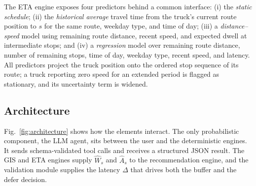 The ETA engine exposes four predictors behind a common interface: (i) the \emph{static schedule}; (ii) the \emph{historical average} travel time from the truck's current route position to $s$ for the same route, weekday type, and time of day; (iii) a \emph{distance--speed} model using remaining route distance, recent speed, and expected dwell at intermediate stops; and (iv) a \emph{regression} model over remaining route distance, number of remaining stops, time of day, weekday type, recent speed, and latency. All predictors project the truck position onto the ordered stop sequence of its route; a truck reporting zero speed for an extended period is flagged as stationary, and its uncertainty term is widened.

\subsection{Architecture}
Fig.~\ref{fig:architecture} shows how the elements interact. The only probabilistic component, the LLM agent, sits between the user and the deterministic engines. It sends schema-validated tool calls and receives a structured JSON result. The GIS and ETA engines supply $\hat{W}_s$ and $\hat{A}_s$ to the recommendation engine, and the validation module supplies the latency $\Delta$ that drives both the buffer and the defer decision.


